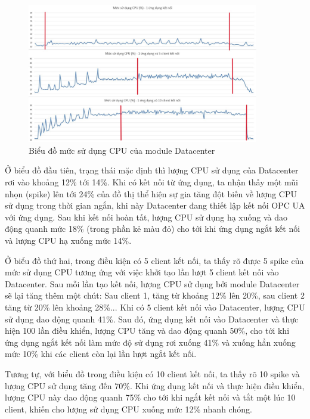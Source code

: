 \begin{figure}[H]
    \centering
    \includegraphics[width=0.9\textwidth]{Images/Result/Datacenter_cpu_2.jpg}
    \caption{Biểu đồ mức sử dụng CPU của module Datacenter}
    \label{fig:Datacenter_cpu_1}
\end{figure}

Ở biểu đồ đầu tiên, trạng thái mặc định thì lượng CPU sử dụng của Datacenter rơi vào khoảng 12\% tới 14\%. Khi có kết nối từ ứng dụng, ta nhận thấy một mũi nhọn (spike) lên tới 24\% của đồ thị thể hiện sự gia tăng đột biến về lượng CPU sử dụng trong thời gian ngắn, khi này Datacenter đang thiết lập kết nối OPC UA với ứng dụng. Sau khi kết nối hoàn tất, lượng CPU sử dụng hạ xuống và dao động quanh mức 18\%  (trong phần kẻ màu đỏ) cho tới khi ứng dụng ngắt kết nối và lượng CPU hạ xuống mức 14\%. 

Ở biểu đồ thứ hai, trong điều kiện có 5 client kết nối, ta thấy rõ được 5 spike của mức sử dụng CPU tương ứng với việc khởi tạo lần lượt 5 client kết nối vào Datacenter. Sau mỗi lần tạo kết nối, lượng CPU sử dụng bởi module Datacenter sẽ lại tăng thêm một chút: Sau client 1, tăng từ khoảng 12\% lên 20\%, sau client 2 tăng từ 20\% lên khoảng 28\%... Khi có 5 client kết nối vào Datacenter, lượng CPU sử dụng dao động quanh 41\%. Sau đó, ứng dụng kết nối vào Datacenter và thực hiện 100 lần điều khiển, lượng CPU tăng và dao động quanh 50\%, cho tới khi ứng dụng ngắt kết nối làm mức độ sử dụng rơi xuống 41\% và xuống hẳn xuống mức 10\% khi các client còn lại lần lượt ngắt kết nối.

Tương tự, với biểu đồ trong điều kiện có 10 client kết nối, ta thấy rõ 10 spike và lượng CPU sử dụng tăng đến 70\%. Khi ứng dụng kết nối và thực hiện điều khiển, lượng CPU này dao động quanh 75\% cho tới khi ngắt kết nối và tắt một lúc 10 client, khiến cho lượng sử dụng CPU xuống mức 12\% nhanh chóng.

